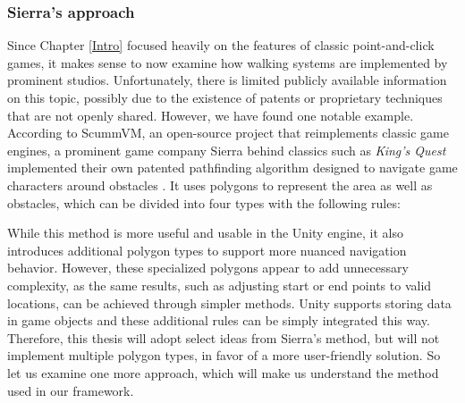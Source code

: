 \subsubsection{Sierra's approach}
Since Chapter \ref{Intro} focused heavily on the features of classic point-and-click games, it makes sense to now examine how walking systems are implemented by prominent studios. Unfortunately, there is limited publicly available information on this topic, possibly due to the existence of patents or proprietary techniques that are not openly shared. However, we have found one notable example. According to ScummVM, an open-source project that reimplements classic game engines, a prominent game company Sierra behind classics such as \textit{King's Quest} implemented their own patented pathfinding algorithm designed to navigate game characters around obstacles \cite{ScummVM-polygons}. It uses polygons to represent the area as well as obstacles, which can be divided into four types with the following rules:

While this method is more useful and usable in the Unity engine, it also introduces additional polygon types to support more nuanced navigation behavior. However, these specialized polygons appear to add unnecessary complexity, as the same results, such as adjusting start or end points to valid locations, can be achieved through simpler methods. Unity supports storing data in game objects and these additional rules can be simply integrated this way. Therefore, this thesis will adopt select ideas from Sierra’s method, but will not implement multiple polygon types, in favor of a more user-friendly solution. So let us examine one more approach, which will make us understand the method used in our framework.


